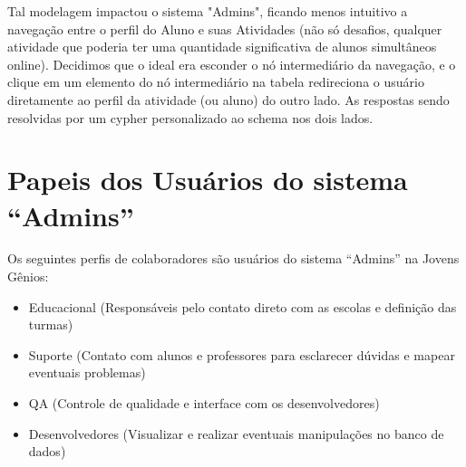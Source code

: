 Tal modelagem impactou o sistema "Admins", ficando menos intuitivo a navegação entre o perfil do Aluno e suas Atividades (não só desafios, qualquer atividade que poderia ter uma quantidade significativa de alunos simultâneos online). Decidimos que o ideal era esconder o nó intermediário da navegação, e o clique em um elemento do nó intermediário na tabela redireciona o usuário diretamente ao perfil da atividade (ou aluno) do outro lado. As respostas sendo resolvidas por um cypher personalizado ao schema nos dois lados.

\section{Papeis dos Usuários do sistema ``Admins''}

Os seguintes perfis de colaboradores são usuários do sistema ``Admins'' na Jovens Gênios:

\begin{itemize}
    \item Educacional (Responsáveis pelo contato direto com as escolas e definição das turmas)
    \item Suporte (Contato com alunos e professores para esclarecer dúvidas e mapear eventuais problemas)
    \item QA (Controle de qualidade e interface com os desenvolvedores)
    \item Desenvolvedores (Visualizar e realizar eventuais manipulações no banco de dados)
\end{itemize}

